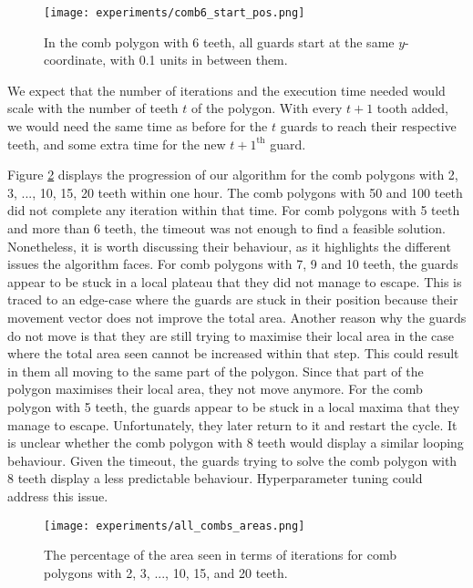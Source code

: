 \begin{figure}[h!]
    \centering
    \texttt{[image: experiments/comb6\_start\_pos.png]}
    \caption{In the comb polygon with 6 teeth, all guards start at the same $y$-coordinate, with 0.1 units in between them.}
    \label{fig:comb6_start_pos}
\end{figure}

We expect that the number of iterations and the execution time needed would scale with the number of teeth $t$ of the polygon. With every $t + 1$ tooth added, we would need the same time as before for the $t$ guards to reach their respective teeth, and some extra time for the new $t + 1^{\text{th}}$ guard. 

Figure \ref{fig:all_combs} displays the progression of our algorithm for the comb polygons with 2, 3, ..., 10, 15, 20 teeth within one hour. The comb polygons with 50 and 100 teeth did not complete any iteration within that time.
For comb polygons with 5 teeth and more than 6 teeth, the timeout was not enough to find a feasible solution. Nonetheless, it is worth discussing their behaviour, as it highlights the different issues the algorithm faces. 
For comb polygons with 7, 9 and 10 teeth, the guards appear to be stuck in a local plateau that they did not manage to escape. This is traced to an edge-case where the guards are stuck in their position because their movement vector does not improve the total area. Another reason why the guards do not move is that they are still trying to maximise their local area in the case where the total area seen cannot be increased within that step. This could result in them all moving to the same part of the polygon. Since that part of the polygon maximises their local area, they  not move anymore.
For the comb polygon with 5 teeth, the guards appear to be stuck in a local maxima that they manage to escape. Unfortunately, they later return to it and restart the cycle. It is unclear whether the comb polygon with 8 teeth would display a similar looping behaviour. Given the timeout, the guards trying to solve the comb polygon with 8 teeth display a less predictable behaviour. Hyperparameter tuning could address this issue.

\begin{figure}[h!]
    \centering
    \texttt{[image: experiments/all\_combs\_areas.png]}
    \caption{The percentage of the area seen in terms of iterations for comb polygons with 2, 3, ..., 10, 15, and 20 teeth.}
    \label{fig:all_combs}
\end{figure}

